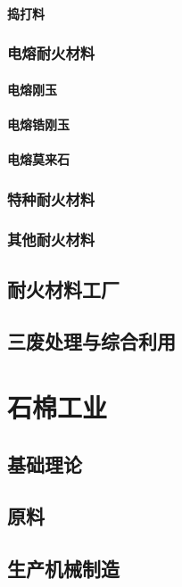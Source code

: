 \documentclass[UTF8]{../../ApplicationUniverse}
\begin{document}
        \subsubsection{捣打料}
    \subsection{电熔耐火材料}
        \subsubsection{电熔刚玉}
        \subsubsection{电熔锆刚玉}
        \subsubsection{电熔莫来石}
    \subsection{特种耐火材料}
    \subsection{其他耐火材料}
\section{耐火材料工厂}
\section{三废处理与综合利用}








\chapter{石棉工业}
\section{基础理论}
\section{原料}
\section{生产机械制造}
\end{document}
